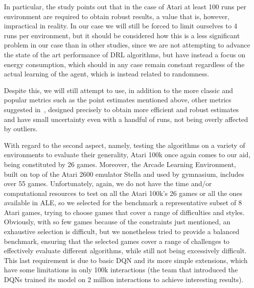 In particular, the study points out that in the case of Atari at least 100 runs per environment are required to obtain robust results, a value that is, however, impractical in reality. In our case we will still be forced to limit ourselves to 4 runs per environment, but it should be considered how this is a less significant problem in our case than in other studies, since we are not attempting to advance the state of the art performance of DRL algorithms, but have instead a focus on energy consumption, which should in any case remain constant regardless of the actual learning of the agent, which is instead related to randomness.

Despite this, we will still attempt to use, in addition to the more classic and popular metrics such as the point estimates mentioned above, other metrics suggested in~\cite{agarwal:statistical_precipice}, designed precisely to obtain more efficient and robust estimates and have small uncertainty even with a handful of runs, not being overly affected by outliers.

With regard to the second aspect, namely, testing the algorithms on a variety of environments to evaluate their generality, Atari 100k once again comes to our aid, being constituted by 26 games. Moreover, the Arcade Learning Environment, built on top of the Atari 2600 emulator Stella and used by gymnasium, includes over 55 games. Unfortunately, again, we do not have the time and/or computational resources to test on all the Atari \num{100}k's 26 games or all the ones available in ALE, so we selected for the benchmark a representative subset of 8 Atari games, trying to choose games that cover a range of difficulties and styles. Obviously, with so few games because of the constraints just mentioned, an exhaustive selection is difficult, but we nonetheless tried to provide a balanced benchmark, ensuring that the selected games cover a range of challenges to effectively evaluate different algorithms, while still not being excessively difficult. This last requirement is due to basic DQN and its more simple extensions, which have some limitations in only 100k interactions (the team that introduced the DQNs trained its model on 2 million interactions to achieve interesting results).


